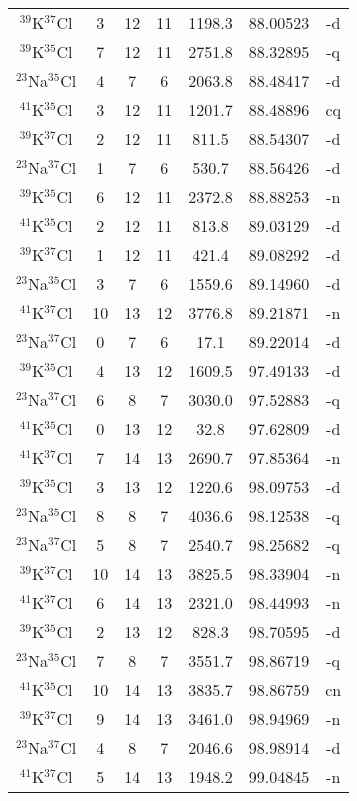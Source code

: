 \begin{table*}[htp]
\begin{tabular}{ccccccc}
$^{39}$K$^{37}$Cl & 3 & 12 & 11 & 1198.3 & 88.00523 & -d \\
$^{39}$K$^{35}$Cl & 7 & 12 & 11 & 2751.8 & 88.32895 & -q \\
$^{23}$Na$^{35}$Cl & 4 & 7 & 6 & 2063.8 & 88.48417 & -d \\
$^{41}$K$^{35}$Cl & 3 & 12 & 11 & 1201.7 & 88.48896 & cq \\
$^{39}$K$^{37}$Cl & 2 & 12 & 11 & 811.5 & 88.54307 & -d \\
$^{23}$Na$^{37}$Cl & 1 & 7 & 6 & 530.7 & 88.56426 & -d \\
$^{39}$K$^{35}$Cl & 6 & 12 & 11 & 2372.8 & 88.88253 & -n \\
$^{41}$K$^{35}$Cl & 2 & 12 & 11 & 813.8 & 89.03129 & -d \\
$^{39}$K$^{37}$Cl & 1 & 12 & 11 & 421.4 & 89.08292 & -d \\
$^{23}$Na$^{35}$Cl & 3 & 7 & 6 & 1559.6 & 89.14960 & -d \\
$^{41}$K$^{37}$Cl & 10 & 13 & 12 & 3776.8 & 89.21871 & -n \\
$^{23}$Na$^{37}$Cl & 0 & 7 & 6 & 17.1 & 89.22014 & -d \\
$^{39}$K$^{35}$Cl & 4 & 13 & 12 & 1609.5 & 97.49133 & -d \\
$^{23}$Na$^{37}$Cl & 6 & 8 & 7 & 3030.0 & 97.52883 & -q \\
$^{41}$K$^{35}$Cl & 0 & 13 & 12 & 32.8 & 97.62809 & -d \\
$^{41}$K$^{37}$Cl & 7 & 14 & 13 & 2690.7 & 97.85364 & -n \\
$^{39}$K$^{35}$Cl & 3 & 13 & 12 & 1220.6 & 98.09753 & -d \\
$^{23}$Na$^{35}$Cl & 8 & 8 & 7 & 4036.6 & 98.12538 & -q \\
$^{23}$Na$^{37}$Cl & 5 & 8 & 7 & 2540.7 & 98.25682 & -q \\
$^{39}$K$^{37}$Cl & 10 & 14 & 13 & 3825.5 & 98.33904 & -n \\
$^{41}$K$^{37}$Cl & 6 & 14 & 13 & 2321.0 & 98.44993 & -n \\
$^{39}$K$^{35}$Cl & 2 & 13 & 12 & 828.3 & 98.70595 & -d \\
$^{23}$Na$^{35}$Cl & 7 & 8 & 7 & 3551.7 & 98.86719 & -q \\
$^{41}$K$^{35}$Cl & 10 & 14 & 13 & 3835.7 & 98.86759 & cn \\
$^{39}$K$^{37}$Cl & 9 & 14 & 13 & 3461.0 & 98.94969 & -n \\
$^{23}$Na$^{37}$Cl & 4 & 8 & 7 & 2046.6 & 98.98914 & -d \\
$^{41}$K$^{37}$Cl & 5 & 14 & 13 & 1948.2 & 99.04845 & -n \\

\end{tabular}
\end{table*}
